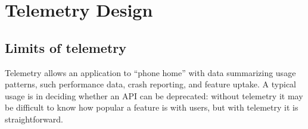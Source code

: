 \documentclass[english,submission,cleveref]{programming}
\begin{document}
\begin{table}
\begin{tabular}{ll}
  \end{tabular}
\end{table}

\section{Telemetry Design}

\subsection{Limits of telemetry}

Telemetry allows an application to ``phone home'' with data
summarizing usage patterns, such performance data, crash reporting,
and feature uptake. A typical usage is in deciding whether an API can
be deprecated: without telemetry it may be difficult to know how
popular a feature is with users, but with telemetry it is
straightforward.
\end{document}
